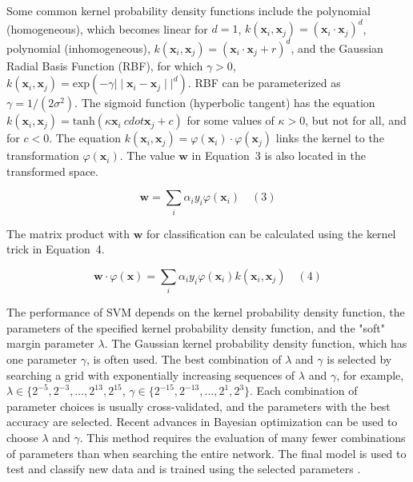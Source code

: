 \documentclass[preprint,12pt]{elsarticle}
\begin{document}
Some common kernel probability density functions include the polynomial (homogeneous), which becomes linear for $d=1$, $k(\mathbf{x}_{i}, \mathbf{x}_{j}) = {(\mathbf{x}_{i} \cdot \mathbf{x}_{j})}^{d}$, polynomial (inhomogeneous), $k(\mathbf{x}_{i}, \mathbf{x}_{j}) = {(\mathbf{x}_{i} \cdot \mathbf{x}_{j} + r)}^{d}$, and the Gaussian Radial Basis Function (RBF), for which $\gamma > 0$, $k(\mathbf{x}_{i}, \mathbf{x}_{j}) = \mathrm{exp}(- \gamma{\mid \mid \mathbf{x}_{i} - \mathbf{x}_{j} \mid \mid}^{d})$. RBF can be parameterized as $\gamma = 1 / (2{\sigma}^{2})$. The sigmoid function (hyperbolic tangent) has the equation $k(\mathbf{x}_{i}, \mathbf{x}_{j}) = \mathrm{tanh}(\kappa \mathbf{x}_{i} \ cdot \mathbf{x}_{j} + c)$ for some values of $\kappa > 0$, but not for all, and for $c < 0$. The equation $k(\mathbf{x}_{i}, \mathbf{x}_{j}) = \varphi(\mathbf{x}_{i}) \cdot \varphi(\mathbf{x}_{j})$ links the kernel to the transformation $\varphi(\mathbf{x}_{i})$. The value $\mathbf{w}$ in Equation~3 is also located in the transformed space.

\begin{equation}
	\mathbf{w} = \sum_{i} \alpha_{i}y_{i}\varphi(\mathbf{x}_{i} )
	\quad\left(3\right)
\end{equation}

The matrix product with $\mathbf{w}$ for classification can be calculated using the kernel trick in Equation~4.

\begin{equation}
	\mathbf{w} \cdot \varphi(\mathbf{x}) = \sum_{i} \alpha_{i}y_{i}\varphi (\mathbf{x}_{i}) k(\mathbf{x}_{i}, \mathbf{x}_{j})
	\quad\left(4\right)
\end{equation}

The performance of SVM depends on the kernel probability density function, the parameters of the specified kernel probability density function, and the "soft" margin parameter $\lambda$. The Gaussian kernel probability density function, which has one parameter $\gamma$, is often used. The best combination of $\lambda$ and $\gamma$ is selected by searching a grid with exponentially increasing sequences of $\lambda$ and $\gamma$, for example, $\lambda \in \{2^{-5},2^{-3},\dots,2^{13},2^{15}$, $\gamma \in \{2^{-15},2^{-13},\dots,2^{1}, 2^{3}\}$. Each combination of parameter choices is usually cross-validated, and the parameters with the best accuracy are selected. Recent advances in Bayesian optimization can be used to choose $\lambda$ and $\gamma$. This method requires the evaluation of many fewer combinations of parameters than when searching the entire network. The final model is used to test and classify new data and is trained using the selected parameters \cite{Hsu2003}.
\end{document}
